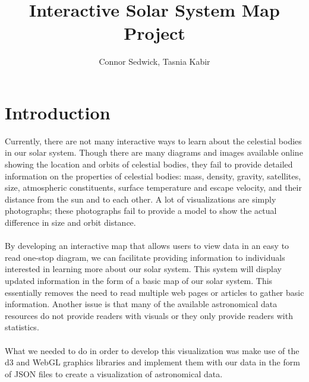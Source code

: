 \documentclass[journal]{vgtc}                %
\title{Interactive Solar System Map Project}
\author{Connor Sedwick, Tasnia Kabir}
\begin{document}

\maketitle
\section{Introduction}
Currently, there are not many interactive ways to learn about the celestial bodies in our solar system. Though there are many diagrams and images available online showing the location and orbits of celestial bodies, they fail to provide detailed information on the properties of celestial bodies: mass, density, gravity, satellites, size, atmospheric constituents, surface temperature and escape velocity, and their distance from the sun and to each other. A lot of visualizations are simply photographs; these photographs fail to provide a model to show the actual difference in size and orbit distance.
\\\\
By developing an interactive map that allows users to view data in an easy to read one-stop diagram, we can facilitate providing information to individuals interested in learning more about our solar system. This system will display updated information in the form of a basic map of our solar system. This essentially removes the need to read multiple web pages or articles to gather basic information. Another issue is that many of the available astronomical data resources do not provide readers with visuals or they only provide readers with statistics.
\\\\
What we needed to do in order to develop this visualization was make use of the d3 and WebGL graphics libraries and implement them with our data in the form of JSON files to create a visualization of astronomical data. 
\end{document}
